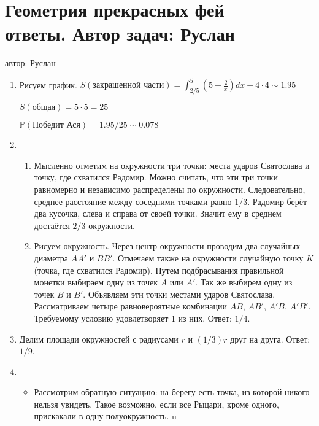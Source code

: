 \documentclass[a4paper,12pt]{article}
\def \P{\mathbb{P}}
\begin{document}
\newpage
\section{Геометрия прекрасных фей — ответы. Автор задач: Руслан}
автор: Руслан

\begin{enumerate}
\item Рисуем график. $S(\text{закрашенной части}) = \int_{2/5}^{5}(5 - \frac{2}{x})dx - 4 \cdot 4 \sim 1.95$

$S(общая) = 5 \cdot 5 = 25$

$\P(\text{Победит Ася}) = 1.95 / 25 \sim 0.078 $
\item

\begin{enumerate}
  \item Мысленно отметим на окружности три точки: места ударов Святослава и точку,
  где схватился Радомир. Можно считать, что эти три точки равномерно
  и независимо распределены по окружности.
  Следовательно, среднее расстояние между соседними точками равно $1/3$.
  Радомир берёт два кусочка, слева и справа от своей точки.
  Значит ему в среднем достаётся $2/3$ окружности.
  \item  Рисуем окружность. Через центр окружности проводим два случайных диаметра $AA'$ и $BB'$. Отмечаем также на окружности случайную точку $K$ (точка, где схватился Радомир). Путем подбрасывания правильной монетки выбираем одну из точек $A$ или $A'$. Так же выбирем одну из точек $B$ и $B'$. Объявляем эти точки местами ударов Святослава. Рассматриваем четыре равновероятные комбинации $AB$, $AB'$, $A'B$, $A'B'$. Требуемому условию удовлетворяет 1 из них. Ответ: $1/4$.



  \end{enumerate}

\item Делим площади окружностей с радиусами $r$ и $ (1/3)r$ друг на друга. Ответ: $1/9$.
\item \begin{itemize}
    \item Рассмотрим обратную ситуацию: на берегу есть точка, из которой никого нельзя увидеть. Такое возможно, если все Рыцари, кроме одного, прискакали в одну полуокружность. u


\end{itemize}
\end{enumerate}
\end{document}
